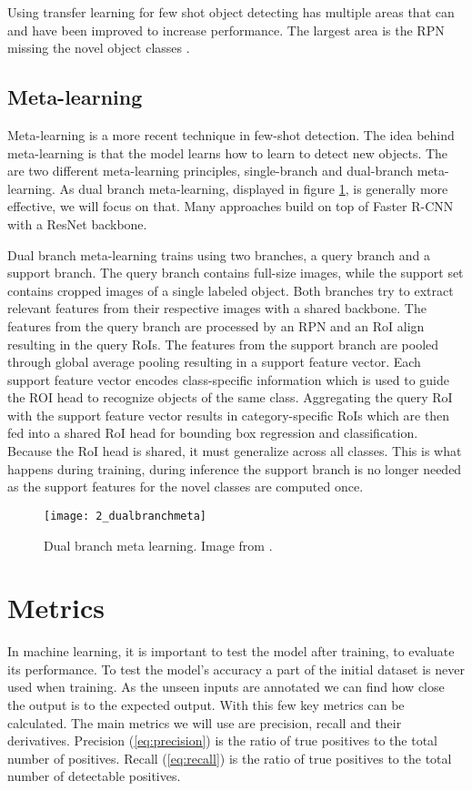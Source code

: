 Using transfer learning for few shot object detecting has multiple areas that can and have been improved to increase performance. The largest area is the RPN missing the novel object classes \cite{DBLP:journals/corr/abs-2011-10142, VU2022104398, DBLP:journals/corr/abs-2105-09491, DBLP:journals/corr/abs-2103-05950,rs14143255}.
\subsection{Meta-learning}
Meta-learning is a more recent technique in few-shot detection. The idea behind meta-learning is that the model learns how to learn to detect new objects. The are two different meta-learning principles, single-branch and dual-branch meta-learning. As dual branch meta-learning, displayed in figure \ref{fig:2_dualbranchmeta}, is generally more effective, we will focus on that. Many approaches build on top of Faster R-CNN with a ResNet backbone.\cite{few-shot-comprehensive-survey}

Dual branch meta-learning trains using two branches, a query branch and a support branch. The query branch contains full-size images, while the support set contains cropped images of a single labeled object. Both branches try to extract relevant features from their respective images with a shared backbone. The features from the query branch are processed by an RPN and an RoI align resulting in the query RoIs. The features from the support branch are pooled through global average pooling resulting in a support feature vector. Each support feature vector encodes class-specific information which is used to guide the ROI head to recognize objects of the same class. Aggregating the query RoI with the support feature vector results in category-specific RoIs which are then fed into a shared RoI head for bounding box regression and classification. Because the RoI head is shared, it must generalize across all classes. This is what happens during training, during inference the support branch is no longer needed as the support features for the novel classes are computed once.

\begin{figure}[h]
	\centering
	\texttt{[image: 2\_dualbranchmeta]}
	\caption{\label{fig:2_dualbranchmeta} Dual branch meta learning. Image from \citet{few-shot-comprehensive-survey}.}
\end{figure}

\section{Metrics}
In machine learning, it is important to test the model after training, to evaluate its performance. To test the model's accuracy a part of the initial dataset is never used when training. As the unseen inputs are annotated we can find how close the output is to the expected output. With this few key metrics can be calculated. The main metrics we will use are precision, recall and their derivatives. Precision (\ref{eq:precision}) is the ratio of true positives to the total number of positives. Recall (\ref{eq:recall}) is the ratio of true positives to the total number of detectable positives.

